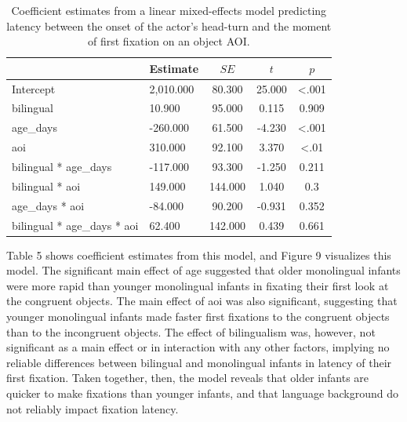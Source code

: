 \documentclass[
  english,
  ,man,floatsintext]{apa6}
\begin{document}
\begin{table}[tbp]

\begin{center}
\begin{threeparttable}

\caption{\label{tab:coef_table_latency}Coefficient estimates from a linear mixed-effects model predicting latency between the onset of the actor's head-turn and the moment of first fixation on an object AOI.}

\begin{tabular}{llccc}
\toprule
 & Estimate & $SE$ & $t$ & $p$\\
\midrule
Intercept & 2,010.000 & 80.300 & 25.000 & <.001\\
bilingual & 10.900 & 95.000 & 0.115 & 0.909\\
age\_days & -260.000 & 61.500 & -4.230 & <.001\\
aoi & 310.000 & 92.100 & 3.370 & <.01\\
bilingual * age\_days & -117.000 & 93.300 & -1.250 & 0.211\\
bilingual * aoi & 149.000 & 144.000 & 1.040 & 0.3\\
age\_days * aoi & -84.000 & 90.200 & -0.931 & 0.352\\
bilingual * age\_days * aoi & 62.400 & 142.000 & 0.439 & 0.661\\
\bottomrule
\end{tabular}

\end{threeparttable}
\end{center}

\end{table}

\noindent Table 5 shows coefficient estimates from this model, and Figure 9 visualizes this model. The significant main effect of age suggested that older monolingual infants were more rapid than younger monolingual infants in fixating their first look at the congruent objects. The main effect of aoi was also significant, suggesting that younger monolingual infants made faster first fixations to the congruent objects than to the incongruent objects. The effect of bilingualism was, however, not significant as a main effect or in interaction with any other factors, implying no reliable differences between bilingual and monolingual infants in latency of their first fixation. Taken together, then, the model reveals that older infants are quicker to make fixations than younger infants, and that language background do not reliably impact fixation latency.
\end{document}
